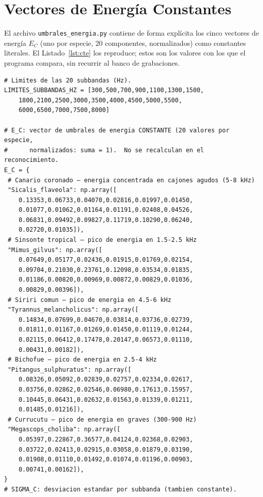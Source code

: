\documentclass[conference]{IEEEtran}
\begin{document}
\section{Vectores de Energía Constantes}\label{sec:constantes}
El archivo \texttt{umbrales\_energia.py} contiene de forma explícita los cinco
vectores de energía $E_C$ (uno por especie, 20 componentes, normalizados) como
constantes literales. El Listado~\ref{lst:cte} los reproduce; estos son los
valores con los que el programa compara, sin recurrir al banco de grabaciones.

\begin{lstlisting}[caption={Vectores de energía CONSTANTES (\texttt{umbrales\_energia.py}).},label=lst:cte]
# Limites de las 20 subbandas (Hz).
LIMITES_SUBBANDAS_HZ = [300,500,700,900,1100,1300,1500,
    1800,2100,2500,3000,3500,4000,4500,5000,5500,
    6000,6500,7000,7500,8000]

# E_C: vector de umbrales de energia CONSTANTE (20 valores por especie,
#      normalizados: suma = 1).  No se recalculan en el reconocimiento.
E_C = {
 # Canario coronado — energia concentrada en cajones agudos (5-8 kHz)
 "Sicalis_flaveola": np.array([
    0.13353,0.06733,0.04070,0.02816,0.01997,0.01450,
    0.01077,0.01062,0.01164,0.01191,0.02408,0.04526,
    0.06831,0.09492,0.09827,0.11719,0.10290,0.06240,
    0.02720,0.01035]),
 # Sinsonte tropical — pico de energia en 1.5-2.5 kHz
 "Mimus_gilvus": np.array([
    0.07649,0.05177,0.02436,0.01915,0.01769,0.02154,
    0.09704,0.21030,0.23761,0.12098,0.03534,0.01835,
    0.01186,0.00820,0.00969,0.00872,0.00829,0.01036,
    0.00829,0.00396]),
 # Siriri comun — pico de energia en 4.5-6 kHz
 "Tyrannus_melancholicus": np.array([
    0.14834,0.07699,0.04670,0.03814,0.03736,0.02739,
    0.01811,0.01167,0.01269,0.01450,0.01119,0.01244,
    0.02115,0.06412,0.17478,0.20147,0.06573,0.01110,
    0.00431,0.00182]),
 # Bichofue — pico de energia en 2.5-4 kHz
 "Pitangus_sulphuratus": np.array([
    0.08326,0.05092,0.02839,0.02757,0.02334,0.02617,
    0.03756,0.02862,0.02546,0.06980,0.17613,0.15957,
    0.10445,0.06431,0.02632,0.01563,0.01339,0.01211,
    0.01485,0.01216]),
 # Currucutu — pico de energia en graves (300-900 Hz)
 "Megascops_choliba": np.array([
    0.05397,0.22867,0.36577,0.04124,0.02368,0.02903,
    0.03722,0.02413,0.02915,0.03058,0.01879,0.03190,
    0.01908,0.01110,0.01492,0.01074,0.01196,0.00903,
    0.00741,0.00162]),
}
# SIGMA_C: desviacion estandar por subbanda (tambien constante).
\end{lstlisting}
\end{document}

